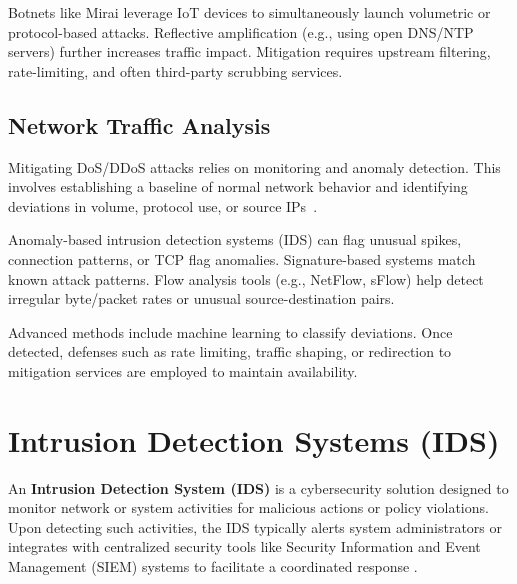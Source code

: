 \documentclass{report}
\begin{document}
Botnets like Mirai leverage IoT devices to simultaneously launch volumetric or protocol-based attacks. Reflective amplification (e.g., using open DNS/NTP servers) further increases traffic impact. Mitigation requires upstream filtering, rate-limiting, and often third-party scrubbing services.

\subsection{Network Traffic Analysis}
Mitigating DoS/DDoS attacks relies on monitoring and anomaly detection. This involves establishing a baseline of normal network behavior and identifying deviations in volume, protocol use, or source IPs~\cite{fidelis_dos, mdpi_dos}.

Anomaly-based intrusion detection systems (IDS) can flag unusual spikes, connection patterns, or TCP flag anomalies. Signature-based systems match known attack patterns. Flow analysis tools (e.g., NetFlow, sFlow) help detect irregular byte/packet rates or unusual source-destination pairs.

Advanced methods include machine learning to classify deviations. Once detected, defenses such as rate limiting, traffic shaping, or redirection to mitigation services are employed to maintain availability.

\section{Intrusion Detection Systems (IDS)}
An \textbf{Intrusion Detection System (IDS)} is a cybersecurity solution designed to monitor network or system activities for malicious actions or policy violations. Upon detecting such activities, the IDS typically alerts system administrators or integrates with centralized security tools like Security Information and Event Management (SIEM) systems to facilitate a coordinated response \cite{ibm_ids}.
\end{document}
